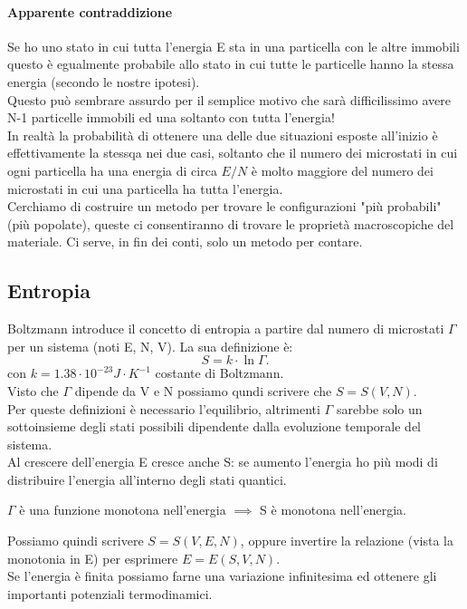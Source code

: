 \paragraph{Apparente contraddizione} %
Se ho uno stato in cui tutta l'energia E sta in una particella con le altre immobili questo è egualmente probabile allo stato in cui tutte le particelle hanno la stessa energia (secondo le nostre ipotesi). \\
Questo può sembrare assurdo per il semplice motivo che sarà difficilissimo avere N-1 particelle immobili ed una soltanto con tutta l'energia! \\
In realtà la probabilità di ottenere una delle due situazioni esposte all'inizio è effettivamente la stessqa nei due casi, soltanto che il numero dei microstati in cui ogni particella ha una energia di circa $E / N$ è molto maggiore del numero dei microstati in cui una particella ha tutta l'energia.\\
Cerchiamo di costruire un metodo per trovare le configurazioni "più probabili" (più popolate), queste ci consentiranno di trovare le proprietà macroscopiche del materiale. Ci serve, in fin dei conti, solo un metodo per contare. 
\subsection*{Entropia}%
Boltzmann introduce il concetto di entropia a partire dal numero di microstati $\Gamma$ per un sistema (noti E, N, V). La sua definizione è:
\[
	S = k\cdot \ln\Gamma
.\] 
con $k = 1.38 \cdot 10^{-23} J\cdot K^{-1}$ costante di Boltzmann.\\
Visto che $\Gamma$ dipende da V e N possiamo qundi scrivere che $S = S\left( V, N \right)$. \\
Per queste definizioni è necessario l'equilibrio, altrimenti $\Gamma$ sarebbe solo un sottoinsieme degli stati possibili dipendente dalla evoluzione temporale del sistema.\\
Al crescere dell'energia E cresce anche S: se aumento l'energia ho più modi di distribuire l'energia all'interno degli stati quantici. 
\begin{center}
$\Gamma$ è una funzione monotona nell'energia $\implies$ S è monotona nell'energia.
\end{center}
Possiamo quindi scrivere $S = S(V,E,N)$, oppure invertire la relazione (vista la monotonia in E) per esprimere $E = E(S,V,N)$.\\ 
Se l'energia è finita possiamo farne una variazione infinitesima ed ottenere gli importanti potenziali termodinamici.
